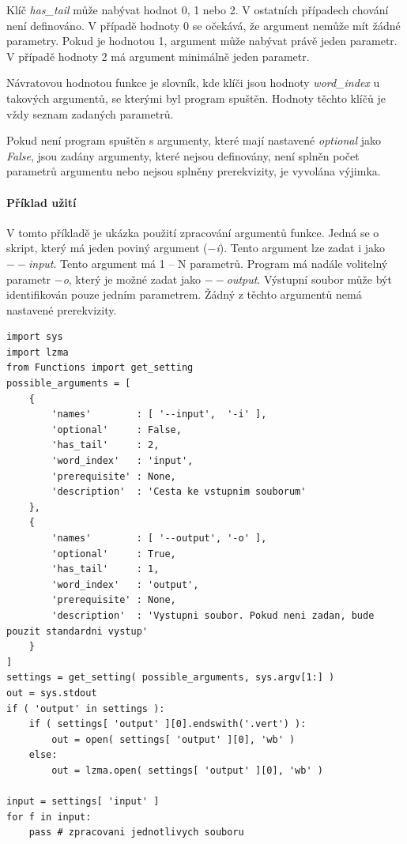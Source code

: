Klíč \textit{has\_tail} může nabývat hodnot 0, 1 nebo 2. V ostatních případech chování není definováno.
V případě hodnoty 0 se očekává, že argument nemůže mít žádné parametry. Pokud je hodnotou 1, argument může
nabývat právě jeden parametr. V případě hodnoty 2 má argument minimálně jeden parametr.

Návratovou hodnotou funkce je slovník, kde klíči jsou hodnoty \textit{word\_index} u takových argumentů, se kterými
byl program spuštěn. Hodnoty těchto klíčů je vždy seznam zadaných parametrů.

Pokud není program spuštěn s argumenty,
které mají nastavené \textit{optional} jako \textit{False}, jsou zadány argumenty, které nejsou definovány, není splněn
počet parametrů argumentu nebo nejsou splněny prerekvizity, je vyvolána výjimka.

\paragraph{Příklad užití}

V tomto příkladě je ukázka použití zpracování argumentů funkce. Jedná se o skript, který má jeden poviný
argument (\textit{$-$i}). Tento argument lze zadat i jako \textit{$--$input}. Tento argument má
1 -- N parametrů. Program má nadále volitelný parametr \textit{$-$o}, který je možné zadat jako
\textit{$--$output}. Výstupní soubor může být identifikován pouze jedním parametrem.
Žádný z těchto argumentů nemá nastavené prerekvizity.
\begin{lstlisting}
import sys
import lzma
from Functions import get_setting
possible_arguments = [
    {
        'names'        : [ '--input',  '-i' ],
        'optional'     : False,
        'has_tail'     : 2,
        'word_index'   : 'input',
        'prerequisite' : None,
        'description'  : 'Cesta ke vstupnim souborum'
    },
    {
        'names'        : [ '--output', '-o' ],
        'optional'     : True,
        'has_tail'     : 1,
        'word_index'   : 'output',
        'prerequisite' : None,
        'description'  : 'Vystupni soubor. Pokud neni zadan, bude pouzit standardni vystup'
    }
]
settings = get_setting( possible_arguments, sys.argv[1:] )
out = sys.stdout
if ( 'output' in settings ):
    if ( settings[ 'output' ][0].endswith('.vert') ):
        out = open( settings[ 'output' ][0], 'wb' )
    else:
        out = lzma.open( settings[ 'output' ][0], 'wb' )

input = settings[ 'input' ]
for f in input:
    pass # zpracovani jednotlivych souboru
\end{lstlisting}

